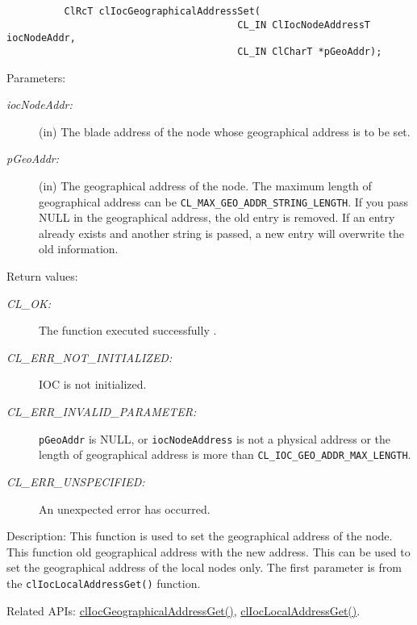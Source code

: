 \begin{flushleft}
\begin{Desc}
\footnotesize\begin{verbatim}          ClRcT clIocGeographicalAddressSet( 
                                 		CL_IN ClIocNodeAddressT iocNodeAddr, 
                                 		CL_IN ClCharT *pGeoAddr); 
\end{verbatim}
\normalsize
\end{Desc}
\begin{Desc}
\item[Parameters:]
\begin{description}
\item[{\em ioc\-Node\-Addr:}](in) The blade address of the node whose geographical address is to be set. 
\item[{\em p\-Geo\-Addr:}](in) The geographical address of the node. The maximum length of geographical address 
can be {\tt{CL\_\-MAX\_\-GEO\_\-ADDR\_\-STRING\_\-LENGTH}}. If you pass NULL in the geographical
address, the old entry is removed. If an entry already exists and another string is passed, a new entry will overwrite the old information.\end{description}
\end{Desc}
\begin{Desc}
\item[Return values:]
\begin{description}
\item[{\em CL\_\-OK:}]The function executed successfully . \item[{\em CL\_\-ERR\_\-NOT\_\-INITIALIZED:}] IOC is not initialized. 
\item[{\em CL\_\-ERR\_\-INVALID\_\-PARAMETER:}] {\tt{p\-Geo\-Addr}} is NULL, or {\tt{ioc\-Node\-Address}} is not a physical address or the length
of geographical address is more than {\tt{CL\_\-IOC\_\-GEO\_\-ADDR\_\-MAX\_\-LENGTH}}. 
\item[{\em CL\_\-ERR\_\-UNSPECIFIED:}]An unexpected error has occurred.\end{description}
\end{Desc}
\begin{Desc}

\item[Description: ]This function is used to set the geographical address of the node. This function old geographical address with the new address. This 
can be used to set the geographical address of the local nodes only. The first parameter is from the {\tt{clIocLocalAddressGet()}} function.\end{Desc}
\begin{Desc}
\item[Related APIs:]\hyperlink{pageIOC125}{clIocGeographicalAddressGet()}, \hyperlink{pageioc128}{clIocLocalAddressGet()}. \end{Desc}


\end{flushleft}
